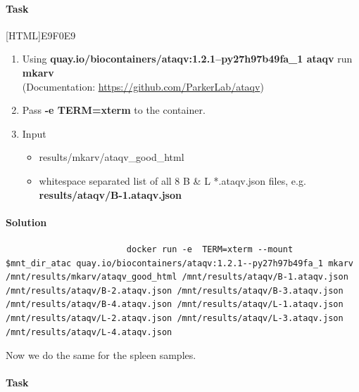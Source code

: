 \documentclass[12pt]{article}
\begin{document}
			\paragraph{Task}
			
				[HTML]{E9F0E9}{\parbox{\linewidth}{%
						\begin{enumerate}
						\item  Using \textbf{quay.io/biocontainers/ataqv:1.2.1--py27h97b49fa\_1 ataqv} run \textbf{mkarv}\\
						(Documentation: \url{https://github.com/ParkerLab/ataqv})
						\item  Pass \textbf{-e TERM=xterm} to the container.
						\item Input
						\begin{itemize}
							\item results/mkarv/ataqv\_good\_html 
							\item whitespace separated list of all 8 B \& L *.ataqv.json files, e.g.  \textbf{results/ataqv/B-1.ataqv.json}  
						\end{itemize}
						
						\end{enumerate}
				}}
			
			\paragraph{Solution}
				
				\begin{minipage}{\linewidth}
					\begin{lstlisting}
						docker run -e  TERM=xterm --mount $mnt_dir_atac quay.io/biocontainers/ataqv:1.2.1--py27h97b49fa_1 mkarv  /mnt/results/mkarv/ataqv_good_html /mnt/results/ataqv/B-1.ataqv.json /mnt/results/ataqv/B-2.ataqv.json /mnt/results/ataqv/B-3.ataqv.json /mnt/results/ataqv/B-4.ataqv.json /mnt/results/ataqv/L-1.ataqv.json /mnt/results/ataqv/L-2.ataqv.json /mnt/results/ataqv/L-3.ataqv.json /mnt/results/ataqv/L-4.ataqv.json
					\end{lstlisting}
				\end{minipage}
			
			Now we do the same for the spleen samples.
			
			\paragraph{Task}
			
\end{document}
